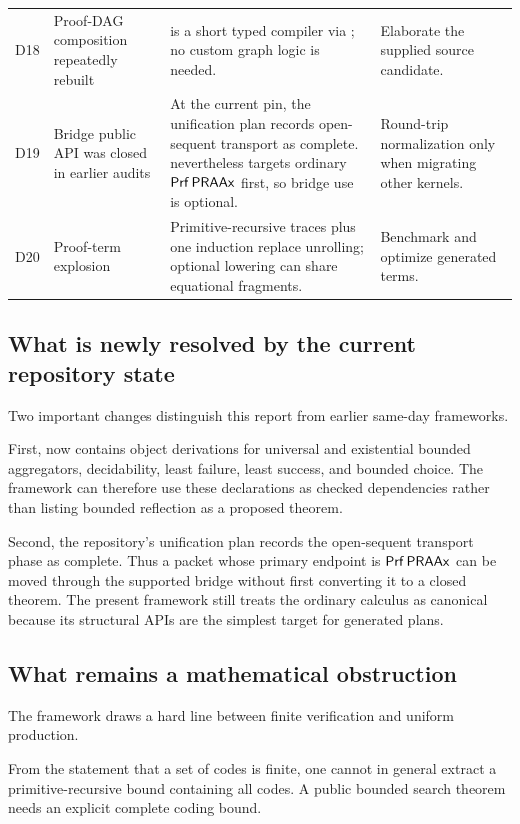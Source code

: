 \begin{longtable}{P{0.05\textwidth}P{0.22\textwidth}P{0.43\textwidth}P{0.25\textwidth}}
D18 & Proof-DAG composition repeatedly rebuilt &  is a short typed compiler via ; no custom graph logic is needed. & Elaborate the supplied source candidate. \\
D19 & Bridge public API was closed in earlier audits & At the current pin, the unification plan records open-sequent transport as complete. \TAPIR{} nevertheless targets ordinary \(\mathsf{Prf}\,\mathsf{PRAAx}\) first, so bridge use is optional. & Round-trip normalization only when migrating other kernels. \\
D20 & Proof-term explosion & Primitive-recursive traces plus one induction replace unrolling; optional  lowering can share equational fragments. & Benchmark and optimize generated terms. \\
\bottomrule
\end{longtable}
\endgroup

\subsection{What is newly resolved by the current repository state}

Two important changes distinguish this report from earlier same-day frameworks.

First,  now contains object derivations for universal and
existential bounded aggregators, decidability, least failure, least success, and bounded choice.  The
framework can therefore use these declarations as checked dependencies rather than listing bounded
reflection as a proposed theorem.

Second, the repository's unification plan records the open-sequent transport phase as complete.
Thus a packet whose primary endpoint is \(\mathsf{Prf}\,\mathsf{PRAAx}\) can be moved through the supported bridge
without first converting it to a closed theorem.  The present framework still treats the ordinary
calculus as canonical because its structural APIs are the simplest target for generated plans.

\subsection{What remains a mathematical obstruction}

The framework draws a hard line between finite verification and uniform production.

\begin{obstruction}
From the statement that a set of codes is finite, one cannot in general extract a primitive-recursive
bound containing all codes.  A public bounded search theorem needs an explicit complete coding bound.
\end{obstruction}

